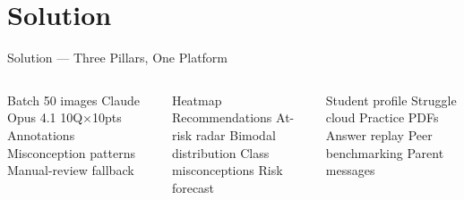 \documentclass[aspectratio=169,10pt]{beamer}
\begin{document}
\section{Solution}

\begin{frame}{Solution — Three Pillars, One Platform}
  \begin{columns}[T]
    \begin{tcolorbox}[enhanced,colback=SSOrange!8,colframe=SSOrange,arc=10pt,
      title=\small\bfseries Pillar I — AI Grading]
      \tiny
      Batch 50 images \textbullet{} Claude Opus 4.1 \textbullet{}
      10Q$\times$10pts \textbullet{} Annotations \textbullet{}
      Misconception patterns \textbullet{} Manual-review fallback
    \end{tcolorbox}
    \begin{tcolorbox}[enhanced,colback=SSBlue!8,colframe=SSBlue,arc=10pt,
      title=\small\bfseries Pillar II — Class Intelligence]
      \tiny
      Heatmap \textbullet{} Recommendations \textbullet{}
      At-risk radar \textbullet{} Bimodal distribution \textbullet{}
      Class misconceptions \textbullet{} Risk forecast
    \end{tcolorbox}
    \begin{tcolorbox}[enhanced,colback=SSGreen!8,colframe=SSGreen,arc=10pt,
      title=\small\bfseries Pillar III — Personal Action]
      \tiny
      Student profile \textbullet{} Struggle cloud \textbullet{}
      Practice PDFs \textbullet{} Answer replay \textbullet{}
      Peer benchmarking \textbullet{} Parent messages
    \end{tcolorbox}
  \end{columns}

  \vspace{0.35cm}
  \centering
\end{frame}
\end{document}

